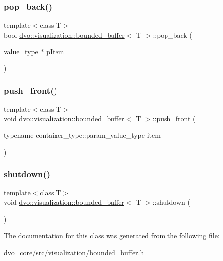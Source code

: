 \subsubsection{\texorpdfstring{pop\+\_\+back()}{pop\_back()}}
{\footnotesize\ttfamily template$<$class T$>$ \\
bool \mbox{\hyperlink{classdvo_1_1visualization_1_1bounded__buffer}{dvo\+::visualization\+::bounded\+\_\+buffer}}$<$ T $>$\+::pop\+\_\+back (\begin{DoxyParamCaption}\item[{\mbox{\hyperlink{classdvo_1_1visualization_1_1bounded__buffer_a69f22957276557660f1bf8b654e3a667}{value\+\_\+type}} $\ast$}]{p\+Item }\end{DoxyParamCaption})\hspace{0.3cm}{\ttfamily [inline]}}

\mbox{\label{classdvo_1_1visualization_1_1bounded__buffer_a2b72854b9be8a3c4831f9f46d2c4a549}} 
\subsubsection{\texorpdfstring{push\+\_\+front()}{push\_front()}}
{\footnotesize\ttfamily template$<$class T$>$ \\
void \mbox{\hyperlink{classdvo_1_1visualization_1_1bounded__buffer}{dvo\+::visualization\+::bounded\+\_\+buffer}}$<$ T $>$\+::push\+\_\+front (\begin{DoxyParamCaption}\item[{typename container\+\_\+type\+::param\+\_\+value\+\_\+type}]{item }\end{DoxyParamCaption})\hspace{0.3cm}{\ttfamily [inline]}}

\mbox{\label{classdvo_1_1visualization_1_1bounded__buffer_ae4afdb9c626f4f38cbc34b81fdfa8bf7}} 
\subsubsection{\texorpdfstring{shutdown()}{shutdown()}}
{\footnotesize\ttfamily template$<$class T$>$ \\
void \mbox{\hyperlink{classdvo_1_1visualization_1_1bounded__buffer}{dvo\+::visualization\+::bounded\+\_\+buffer}}$<$ T $>$\+::shutdown (\begin{DoxyParamCaption}{ }\end{DoxyParamCaption})\hspace{0.3cm}{\ttfamily [inline]}}



The documentation for this class was generated from the following file\+:\begin{DoxyCompactItemize}
\item 
dvo\+\_\+core/src/visualization/\mbox{\hyperlink{bounded__buffer_8h}{bounded\+\_\+buffer.\+h}}\end{DoxyCompactItemize}
